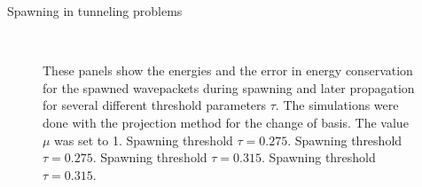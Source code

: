 \begin{chapter}{Spawning in tunneling problems}
\begin{figure}[h!]
{  } \\
  \caption[Energies and energy drift of the spawned wavepackets during spawning and later propagation]{
  These panels show the energies and the error in energy conservation for the spawned wavepackets
  during spawning and later propagation for several different threshold parameters $\tau$.
  The simulations were done with the projection method for the change of basis. The value $\mu$ was set to 1.
   Spawning threshold $\tau = 0.275$.
   Spawning threshold $\tau = 0.275$.
   Spawning threshold $\tau = 0.315$.
   Spawning threshold $\tau = 0.315$.
  \label{fig:spawn_propag_project_K100_bs1_energies}
  }
\end{figure}



\end{chapter}
